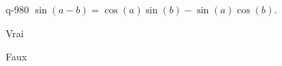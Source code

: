 \begin{truefalse}{q-980}
$\sin(a-b)=\cos(a)\sin(b)-\sin(a)\cos(b)$.
\item Vrai
\item* Faux
\end{truefalse}

